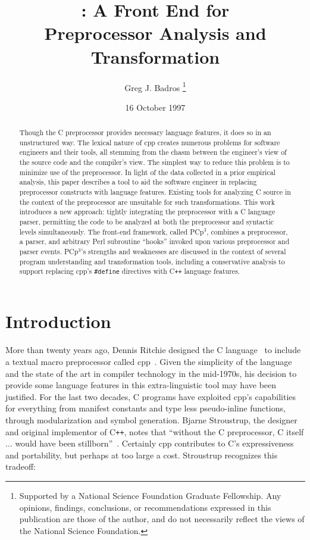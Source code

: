 \documentclass{article}
\title{\pcp{}: A \C{} Front End for \\ Preprocessor Analysis and Transformation}
\author{Greg J. Badros%
  \thanks{Supported by a National Science Foundation
    Graduate Fellowship. Any opinions, findings, conclusions, or
    recommendations expressed in this publication are those of the
    author, and do not necessarily reflect the views of the National
    Science Foundation.}
  \\  \email{gjb@cs.washington.edu}}
\date{16 October 1997}
\newcommand{\pcp}{\mbox{\textsf{PCp}$^3$}}
\newcommand{\Cpp}{\mbox{\textsf{cpp}}}
\newcommand{\CPP}{\mbox{\textsf{C\texttt{++}}}}
\newcommand{\Perl}{\mbox{\textsf{Perl}}}
\newcommand{\C}{\mbox{\textsf{C}}}
\newcommand{\ppd}[1]{\texttt{\##1}}
\begin{document}
\maketitle

\begin{abstract}
\label{sec:abstract}
Though the \C{} preprocessor provides necessary language features, it
does so in an unstructured way.  The lexical nature of \Cpp{} creates
numerous problems for software engineers and their tools, all stemming
from the chasm between the engineer's view of the source code and the
compiler's view.  The simplest way to reduce this problem is to minimize
use of the preprocessor.  In light of the data collected in a prior
empirical analysis, this paper describes a tool to aid the software
engineer in replacing preprocessor constructs with language features.
Existing tools for analyzing \C{} source in the context of the
preprocessor are unsuitable for such transformations. This work
introduces a new approach: tightly integrating the preprocessor with a
\C{} language parser, permitting the code to be analyzed at both the
preprocessor and syntactic levels simultaneously.  The front-end
framework, called \pcp{}, combines a preprocessor, a parser, and
arbitrary \Perl{} subroutine ``hooks'' invoked upon various preprocessor
and parser events.  \pcp{}'s strengths and weaknesses are discussed in
the context of several program understanding and transformation tools,
including a conservative analysis to support replacing \Cpp{}'s
\ppd{define} directives with \CPP{} language features.

\end{abstract}
\bigskip

\section{Introduction}
\label{sec:intro}
More than twenty years ago, Dennis Ritchie designed the \C{}
language~\cite{Kernighan88} to include a textual macro preprocessor
called \Cpp{}~\cite[Ch.~3]{Harbison91}.  Given the simplicity of the
language and the state of the art in compiler technology in the
mid-1970s, his decision to provide some language features in this
extra-linguistic tool may have been justified.  For the last two
decades, \C{} programs have exploited \Cpp{}'s capabilities for
everything from manifest constants and type less pseudo-inline
functions, through modularization and symbol generation.  Bjarne
Stroustrup, the designer and original implementor of \CPP{}, notes that
``without the \C{} preprocessor, \C{} itself $\ldots$ would have been
stillborn''~\cite[p.~119]{Stroustrup94}.  Certainly \Cpp{}
contributes to \C{}'s expressiveness and portability, but
perhaps at too large a cost.  Stroustrup recognizes this tradeoff:
\end{document}

